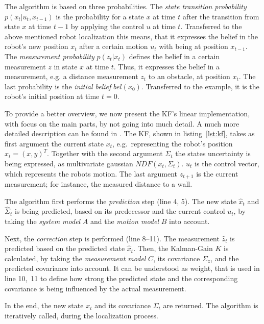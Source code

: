 The algorithm is based on three probabilities. The \emph{state transition probability} $p(x_t | u_t , x_{t-1})$ is the probability for a state $x$ at time $t$ after the transition from state $x$ at time $t-1$ by applying the control $u$ at time $t$. Transferred to the above mentioned robot localization this means, that it expresses the belief in the robot's new position $x_t$ after a certain motion $u_t$ with being at position $x_{t-1}$. The \emph{measurement probability} $p(z_t|x_t)$ defines the belief in a certain measurement $z$ in state $x$ at time $t$. Thus, it expresses the belief in a measurement, e.g. a distance measurement $z_t$ to an obstacle, at position $x_t$. The last probability is the \emph{initial belief} $bel(x_0)$. Transferred to the example, it is the robot's initial position at time $t = 0$.


To provide a better overview, we now present the \acs{KF}'s linear implementation, with focus on the main parts, by not going into much detail. A much more detailed description can be found in \citet{thrun:prob_robo}. 
The \acs{KF}, shown in listing~\ref{lst:kf}, takes as first argument the current state $x_t$, e.g.\ representing the robot's position $x_t = (x, y)^T$. Together with the second argument $\Sigma_t$ the states uncertainty is being expressed, as multivariate gaussian $NDF(x_t, \Sigma_t)$. $u_t$ is the control vector, which represents the robots motion. The last argument $z_{t+1}$ is the current measurement; for instance, the measured distance to a wall.

The algorithm first performs the \emph{prediction} step (line 4, 5). The new state $\hat{x}_t$ and $\hat{\Sigma}_t$ is being predicted, based on its predecessor and the current control $u_t$, by taking the \emph{system model} $A$ and the \emph{motion model} $B$ into account.

Next, the \emph{correction} step is performed (line 8--11). The measurement $\hat{z}_t$ is predicted based on the predicted state $\hat{x}_t$. Then, the Kalman-Gain $K$ is calculated, by taking the \emph{measurement model} $C$, its covariance $\Sigma_z$, and the predicted covariance into account. It can be understood as weight, that is used in line 10,~11 to define how strong the predicted  state and the corresponding covariance is being influenced by the actual measurement.

In the end, the new state $x_t$ and its covariance $\Sigma_t$ are returned. The algorithm is iteratively called, during the localization process.

